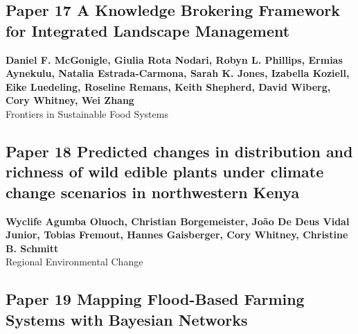 \documentclass[
]{article}
\begin{document}
\newpage

\hypertarget{mcgonigle_knowledge_2020}{%
\subsection{Paper 17 A Knowledge Brokering Framework for Integrated
Landscape Management}\label{mcgonigle_knowledge_2020}}

\begin{center}
\vspace*{2cm}
{\Large \textbf{Daniel F. McGonigle, Giulia Rota Nodari, Robyn L. Phillips, Ermias Aynekulu, Natalia Estrada-Carmona, Sarah K. Jones, Izabella Koziell, Eike Luedeling, Roseline Remans, Keith Shepherd, David Wiberg, Cory Whitney, Wei Zhang}} \\[0.5cm]
\vspace*{1cm}
{\Large Frontiers in Sustainable Food Systems} \\[2cm]
\end{center}


\newpage

\hypertarget{oluoch_predicted_2024}{%
\subsection{Paper 18 Predicted changes in distribution and richness of
wild edible plants under climate change scenarios in northwestern
Kenya}\label{oluoch_predicted_2024}}

\begin{center}
\vspace*{2cm}
{\Large \textbf{Wyclife Agumba Oluoch, Christian Borgemeister, João De Deus Vidal Junior, Tobias Fremout, Hannes Gaisberger, Cory Whitney, Christine B. Schmitt}} \\[0.5cm]
\vspace*{1cm}
{\Large Regional Environmental Change} \\[2cm]
\end{center}


\newpage

\hypertarget{liman_harou_mapping_2020}{%
\subsection{Paper 19 Mapping Flood-Based Farming Systems with Bayesian
Networks}\label{liman_harou_mapping_2020}}
\end{document}
